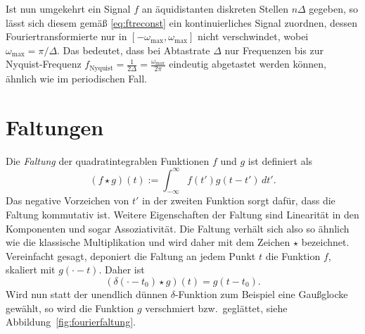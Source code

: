 Ist nun umgekehrt ein Signal $f$ an äquidistanten diskreten Stellen
$n\Delta$ gegeben, so lässt sich diesem gemäß \eqref{eq:ftreconst} ein
kontinuierliches Signal zuordnen, dessen Fouriertransformierte nur in
$[-\omega_\text{max},\omega_\text{max}]$ nicht verschwindet, wobei $\omega_\text{max} =
\pi/\Delta$. Das bedeutet, dass bei Abtastrate $\Delta$ nur Frequenzen
bis zur Nyquist-Frequenz $f_\text{Nyquist}=\frac{1}{2\Delta} =
\frac{\omega_\text{max}}{2\pi}$ eindeutig abgetastet werden können, ähnlich wie
im periodischen Fall.

\section{Faltungen}

Die \emph{Faltung} der quadratintegrablen Funktionen $f$ und $g$ ist
definiert als
\begin{equation}
  (f \star g)(t) := \int_{-\infty}^{\infty} f(t')g(t-t')\,dt'.
\end{equation}
Das negative Vorzeichen von $t'$ in der zweiten Funktion sorgt
dafür, dass die Faltung kommutativ ist. Weitere Eigenschaften der
Faltung sind Linearität in den Komponenten und sogar
Assoziativität. Die Faltung verhält sich also so ähnlich wie die
klassische Multiplikation und wird daher mit dem Zeichen $\star$
bezeichnet.  Vereinfacht gesagt, deponiert die Faltung an jedem Punkt
$t$ die Funktion $f$, skaliert mit $g(\cdot - t) $. Daher ist \zb
\begin{equation}
  (\delta(\cdot - t_0) \star g)(t) = g(t - t_0).
\end{equation}
Wird nun statt der unendlich dünnen $\delta$-Funktion zum Beispiel
eine Gaußglocke gewählt, so wird die Funktion $g$ verschmiert
bzw.\ geglättet, siehe Abbildung~\ref{fig:fourierfaltung}.

